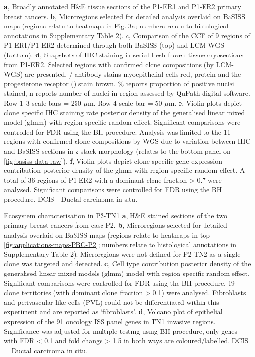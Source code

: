     {\textbf{a}, Broadly annotated H\&E tissue sections of the P1-ER1 and P1-ER2 primary breast cancers. \textbf{b}, Microregions selected for detailed analysis overlaid on \ac{BaSISS} maps (regions relate to heatmaps in Fig. 3a; numbers relate to histological annotations in Supplementary Table 2). c, Comparison of the \acf{CCF} of 9 regions of P1-ER1/P1-ER2 determined through both \ac{BaSISS} (top) and \acf{LCM} \acf{WGS} (bottom). \textbf{d}, Snapshots of \acf{IHC} staining in serial fresh frozen tissue cryosections from P1-ER2. Selected regions with confirmed clone compositions (by \ac{LCM}-\ac{WGS}) are presented. / antibody stains myoepithelial cells red,  protein and the progesterone receptor () stain brown. \% reports proportion of positive nuclei stained, n reports number of nuclei in region assessed by QuPath digital software. Row 1–3 scale bars = 250 $\mu$m. Row 4 scale bar = 50 $\mu$m. \textbf{e}, Violin plots depict clone specific  \ac{IHC} staining rate posterior density of the generalised linear mixed model (glmm) with region specific random effect. Significant comparisons were controlled for \ac{FDR} using the \ac{BH} procedure. Analysis was limited to the 11 regions with confirmed clone compositions by WGS due to variation between \ac{IHC} and \ac{BaSISS} sections in z-stack morphology (relates to the bottom panel on \cref{fig:basiss-data-raw}). \textbf{f}, Violin plots depict clone specific gene expression contribution posterior density of the glmm with region specific random effect. A total of 36 regions of P1-ER2 with a dominant clone fraction > 0.7 were analysed. Significant comparisons were controlled for \ac{FDR} using the \ac{BH} procedure. \ac{DCIS} - Ductal carcinoma in situ.}

    {Ecosystem characterisation in P2-TN1}
    {\textbf{a}, H\&E stained sections of the two primary breast cancers from case P2. \textbf{b}, Microregions selected for detailed analysis overlaid on BaSISS maps (regions relate to heatmaps in top \cref{fig:applications-maps-PBC-P2}; numbers relate to histological annotations in Supplementary Table 2). Microregions were not defined for P2-TN2 as a single clone was targeted and detected. \textbf{c}, Cell type contribution posterior density of the generalised linear mixed models (glmm) model with region specific random effect. Significant comparisons were controlled for \ac{FDR} using the \ac{BH} procedure. 19 clone territories (with dominant clone fraction > 0.1) were analysed. Fibroblasts and perivascular-like cells (PVL) could not be differentiated within this experiment and are reported as `fibroblasts'. \textbf{d}, Volcano plot of epithelial expression of the 91 oncology \ac{ISS} panel genes in TN1 invasive regions. Significance was adjusted for multiple testing using BH procedure, only genes with \ac{FDR} < 0.1 and fold change > 1.5 in both ways are coloured/labelled. \ac{DCIS} = Ductal carcinoma in situ.}

